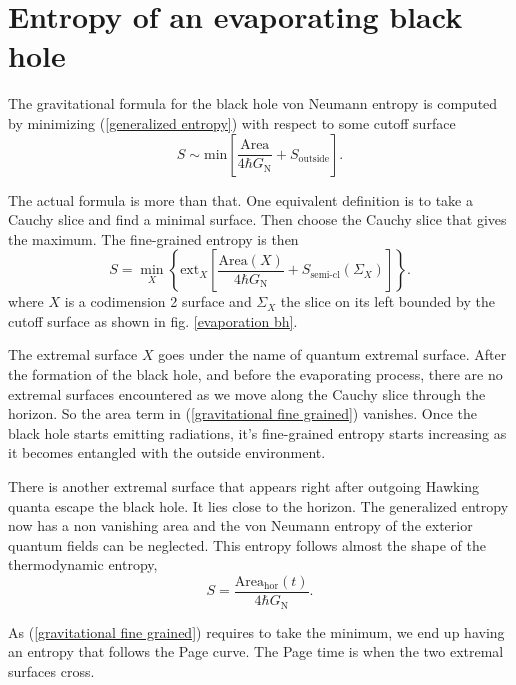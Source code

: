 \section{Entropy of an evaporating black hole}

The gravitational formula for the black hole von Neumann entropy is computed by minimizing (\ref{generalized entropy}) with respect to some cutoff surface
\begin{equation}\label{approx gravitational fine grained}
    S \sim \text{min}\left[\frac{\text{Area}}{4\hbar G_\text{N}} + S_\text{outside}\right].
\end{equation}

The actual formula is more than that. One equivalent definition is to take a Cauchy slice and find a minimal surface. Then choose the Cauchy slice that gives the maximum. The fine-grained entropy is then
\begin{equation}\label{gravitational fine grained}
    S = \min_X\left\{\text{ext}_X\left[\frac{\text{Area}\left(X\right)}{4\hbar G_\text{N}} + S_\text{semi-cl}\left(\Sigma_X\right)\right]\right\}.
\end{equation}
where $X$ is a codimension 2 surface and $\Sigma_X$ the slice on its left bounded by the cutoff surface as shown in fig. \ref{evaporation bh}.

The extremal surface $X$ goes under the name of quantum extremal surface. After the formation of the black hole, and before the evaporating process, there are no extremal surfaces encountered as we move along the Cauchy slice through the horizon. So the area term in (\ref{gravitational fine grained}) vanishes. Once the black hole starts emitting radiations, it's fine-grained entropy starts increasing as it becomes entangled with the outside environment. 
 
There is another extremal surface that appears right after outgoing Hawking quanta escape the black hole. It lies close to the horizon. The generalized entropy now has a non vanishing area and the von Neumann entropy of the exterior quantum fields can be neglected. This entropy follows almost the shape of the thermodynamic entropy,
\begin{equation}
    S = \frac{\text{Area}_\text{hor}\left(t\right)}{4\hbar G_\text{N}}.
\end{equation}

As (\ref{gravitational fine grained}) requires to take the minimum, we end up having an entropy that follows the Page curve. The Page time is when the two extremal surfaces cross.

